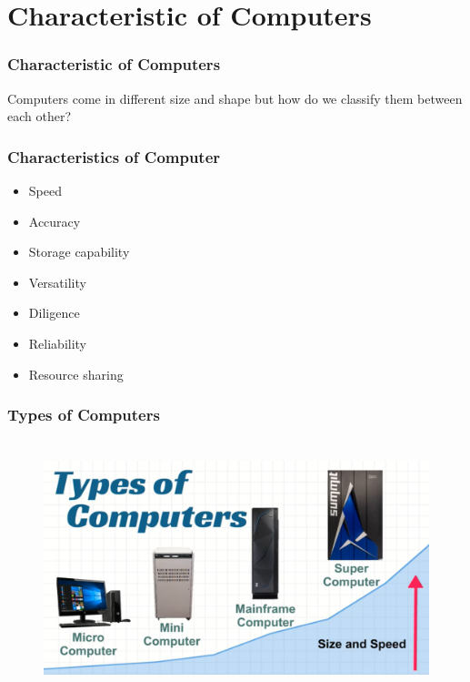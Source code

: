 \section{Characteristic of Computers}
\begin{frame}
	\frametitle{Characteristic of Computers}
		Computers come in different size and shape but how do we classify them between each other?
\frametitle{Characteristics of Computer}
\begin{itemize}
	\item<1-> Speed
	\item<2-> Accuracy
	\item<3-> Storage capability
	\item<4-> Versatility
	\item<5-> Diligence
	\item<6-> Reliability
	\item<7-> Resource sharing
\end{itemize}
\end{frame}
\begin{frame}
\frametitle{Types of Computers}
\begin{figure}
\centering
\includegraphics[width=400pt,height=210pt]{figures/fig2.png}
\label{fig:computers}
\end{figure}	
\end{frame}

